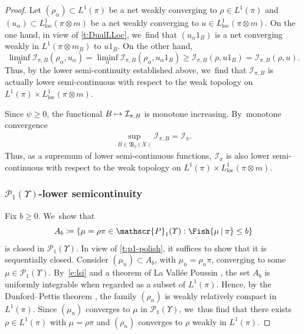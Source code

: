 \documentclass[10pt]{amsart}
\newcommand\mto{\mathchoice{\longmapsto}{\mapsto}{\mapsto}{\mapsto}}
\theoremstyle{definition}
\theoremstyle{remark}
\DeclarePairedDelimiter{\set}{\lbrace}{\rbrace}
\newcommand{\given}[1][]{%
\nonscript\:#1\vert
\allowbreak
\nonscript\:
\mathopen{}}
\begin{document}
\begin{proof}
Let $(\rho_{\alpha}) \subset L^{1}(\pi)$ be a net weakly converging to $\rho \in L^{1}(\pi)$ and $(u_{\alpha}) \subset L^1_{\mathrm{loc}}(\pi\otimes m)$ be a net weakly converging to $u\in L^1_{\mathrm{loc}}(\pi\otimes m)$.
On the one hand, in view of \cref{t:DualLLoc}, we~find that $(u_{\alpha} 1_{B})$ is a net converging weakly in $L^{1}(\pi \otimes m_{B})$ to $u 1_{B}$.
On the other hand,
\begin{equation*}
\liminf_{\alpha} \mathcal{I}_{\pi,B}(\rho_{\alpha}, u_{\alpha}) = \liminf_{\alpha} \mathcal{I}_{\pi,B}(\rho_{\alpha}, u_{\alpha} 1_{B}) \geq \mathcal{I}_{\pi,B}(\rho, u 1_{B}) = \mathcal{I}_{\pi,B}(\rho, u).
\end{equation*}
Thus, by the lower semi-continuity established above, we~find that $\mathcal{I}_{\pi,B}$ is actually lower semi-continuous with respect to the weak topology on $L^{1}(\pi) \times L^{1}_{\mathrm{loc}}(\pi \otimes m)$.

Since $\psi\geq 0$, the functional $B\mto \mathcal{I}_{\pi,B}$ is monotone increasing.
By~monotone convergence
\begin{align}\label{e:restricted-fisher}
\sup_{B\in\mathfrak{B}_0(X)} \mathcal{I}_{\pi,B} = \mathcal{I}_{\pi}.
\end{align}
Thus, as a supremum of lower semi-continuous functions, $\mathcal{I}_{\pi}$ is also lower semi-continuous with respect to the weak topology on $L^{1}(\pi) \times L^{1}_{\mathrm{loc}}(\pi \otimes m)$.

\subsubsection*{$\mathscr{P}_1(\varUpsilon)$-lower semicontinuity}
Fix $b \geq 0$. We~show that
\begin{equation*}
A_b \coloneq \set*{ \mu =\rho\pi \in \mathscr{P}_{1}(\varUpsilon) : \Fish{ \mu \given \pi } \leq b }
\end{equation*}
is closed in $\mathscr{P}_{1}(\varUpsilon)$.
In view of \cref{t:p1-polish}, it suffices to show that it is sequentially closed.
Consider $(\mu_{n}) \subset A_b$, with $\mu_n= \rho_n\pi$, converging to some $\mu \in \mathscr{P}_{1}(\varUpsilon)$.
By~\cref{e:lsi} and a theorem of La Vallée Poussin \cite[Th.\,22, p.\,38]{DellacherieMeyer}, the set $A_b$ is uniformly integrable when regarded as a subset of $L^1(\pi)$.
Hence, by the Dunford--Pettis theorem \cite[Th.\,25, p.\,43]{DellacherieMeyer}, the family $(\rho_{n})$ is weakly relatively compact in $L^{1}(\pi)$.
Since $(\mu_{n})$ converges to $\mu$ in $\mathscr{P}_{1}(\varUpsilon)$, we~thus find that there exists $\rho \in L^{1}(\pi)$ with $\mu = \rho \pi$ and $(\rho_{n})$ converges to $\rho$ weakly in $L^{1}(\pi)$.


\end{proof}
\end{document}
